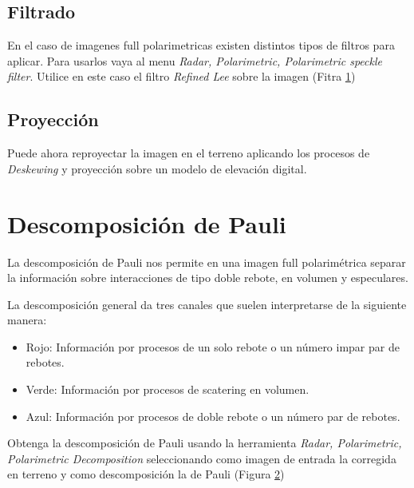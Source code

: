 \subsection{Filtrado}

En el caso de imagenes full polarimetricas existen distintos tipos de filtros para aplicar. Para usarlos vaya al menu \emph{Radar, Polarimetric, Polarimetric speckle filter}. Utilice en este caso el filtro \emph{Refined Lee} sobre la imagen  (Fitra \ref{fig:plee})

\begin{figure}[h!]
    \centering
    \hfill
    \caption{}
    \label{fig:plee}
\end{figure}

\subsection{Proyección}

Puede ahora reproyectar la imagen en el terreno aplicando los procesos de \emph{Deskewing} y proyección sobre un modelo de elevación digital.

\section{Descomposición de Pauli}

La descomposición de Pauli nos permite en una imagen full polarimétrica separar la información sobre interacciones de tipo doble rebote, en volumen y especulares.

La descomposición general da tres canales que suelen interpretarse de la siguiente manera:

\begin{itemize}
    \item Rojo: Información por procesos de un solo rebote o un número impar par de rebotes.
    \item Verde: Información por procesos de scatering en volumen.
    \item Azul: Información por procesos de doble rebote o un número par de rebotes.
\end{itemize}

Obtenga la descomposición de Pauli usando la herramienta \emph{Radar, Polarimetric, Polarimetric Decomposition} seleccionando como imagen de entrada la corregida en terreno y como descomposición la de Pauli (Figura \ref{fig:pauli})

\begin{figure}[h!]
    \centering
    \hfill
    \caption{}
    \label{fig:pauli}
\end{figure}
